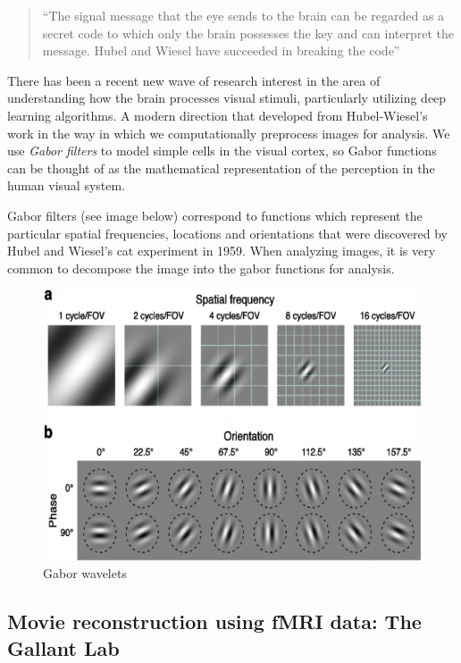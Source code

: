 \begin{quote}

``The signal message that the eye sends to the brain can be regarded as a secret code to which only the brain possesses the key and can interpret the message. Hubel and Wiesel have succeeded in breaking the code''
\end{quote}


There has been a recent new wave of research interest in the area of understanding how the brain processes visual stimuli, particularly utilizing deep learning algorithms. A modern direction that developed from Hubel-Wiesel's work in the way in which we computationally preprocess images for analysis. We use \emph{Gabor filters} to model simple cells in the visual cortex, so Gabor functions can be thought of as the mathematical representation of the perception in the human visual system.

Gabor filters (see image below) correspond to functions which represent the particular spatial frequencies, locations and orientations that were discovered by Hubel and Wiesel's cat experiment in 1959. When analyzing images, it is very common to decompose the image into the gabor functions for analysis.

\begin{figure}[H]
\begin{center}
\includegraphics[scale=0.5]{gabor.png}
\end{center}
\caption{Gabor wavelets}
\label{fig:gabor}
\end{figure}


\subsection*{Movie reconstruction using fMRI data: The Gallant Lab}


